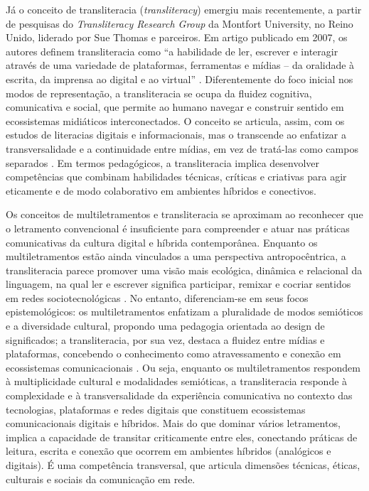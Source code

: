\documentclass[portuguese]{textolivre}
\begin{document}
Já o conceito de transliteracia (\textit{transliteracy}) emergiu mais recentemente, a partir de pesquisas do \textit{Transliteracy Research Group} da Montfort University, no Reino Unido, liderado por Sue Thomas e parceiros. Em artigo publicado em 2007, os autores definem transliteracia como “a habilidade de ler, escrever e interagir através de uma variedade de plataformas, ferramentas e mídias – da oralidade à escrita, da imprensa ao digital e ao virtual” \cite[p. 2]{thomas2007crossingdivides}. Diferentemente do foco inicial nos modos de representação, a transliteracia se ocupa da fluidez cognitiva, comunicativa e social, que permite ao humano navegar e construir sentido em ecossistemas midiáticos interconectados. O conceito se articula, assim, com os estudos de literacias digitais e informacionais, mas o transcende ao enfatizar a transversalidade e a continuidade entre mídias, em vez de tratá-las como campos separados \cite{thomas2009transliteracy,andrews2013digitalliteracies}. Em termos pedagógicos, a transliteracia implica desenvolver competências que combinam habilidades técnicas, críticas e criativas para agir eticamente e de modo colaborativo em ambientes híbridos e conectivos.

Os conceitos de multiletramentos e transliteracia se aproximam ao reconhecer que o letramento convencional é insuficiente para compreender e atuar nas práticas comunicativas da cultura digital e híbrida contemporânea. Enquanto os multiletramentos estão ainda vinculados a uma perspectiva antropocêntrica, a transliteracia parece promover uma visão mais ecológica, dinâmica e relacional da linguagem, na qual ler e escrever significa participar, remixar e cocriar sentidos em redes sociotecnológicas \cite{lankshear2011newliteracies}. No entanto, diferenciam-se em seus focos epistemológicos: os multiletramentos enfatizam a pluralidade de modos semióticos e a diversidade cultural, propondo uma pedagogia orientada ao design de significados; a transliteracia, por sua vez, destaca a fluidez entre mídias e plataformas, concebendo o conhecimento como atravessamento e conexão em ecossistemas comunicacionais \cite{thomas2007crossingdivides,cope2009multiliteracies}. Ou seja, enquanto os multiletramentos respondem à multiplicidade cultural e modalidades semióticas, a transliteracia responde à complexidade e à transversalidade da experiência comunicativa no contexto das tecnologias, plataformas e redes digitais que constituem ecossistemas comunicacionais digitais e híbridos. Mais do que dominar vários letramentos, implica a capacidade de transitar criticamente entre eles, conectando práticas de leitura, escrita e conexão que ocorrem em ambientes híbridos (analógicos e digitais). É uma competência transversal, que articula dimensões técnicas, éticas, culturais e sociais da comunicação em rede.
\end{document}
